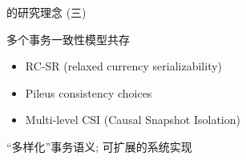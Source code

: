 \begin{frame}{\ideadt{}的研究理念 (三)}
  \begin{table}[]
	\centering
	\renewcommand\arraystretch{1.5}
  \end{table}

  \begin{description}
	\setlength{\itemsep}{5pt}
	\item[思想:] 多个事务一致性模型共存
	\item[典型:] 
	  \begin{itemize}
		\item RC-SR {\scriptsize (relaxed currency serializability)} 
		\item Pileus consistency choices 
		\item Multi-level CSI {\scriptsize (Causal Snapshot Isolation)} 
	  \end{itemize}
	  \pause
	\item[挑战:] ``多样化''事务语义; 可扩展的系统实现
  \end{description}
\end{frame}
